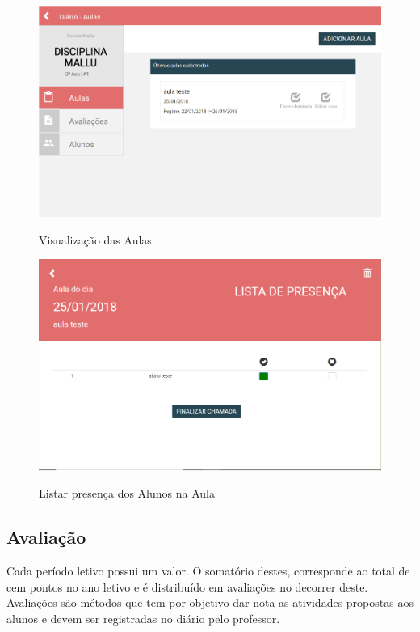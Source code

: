 \begin{figure}[!htb]
	\centering
	\caption{Visualização das Aulas } %
	\includegraphics[scale=0.4]{visualizaAulas}\\  %
	{\small } %
	\label{visualizaAulas} %
\end{figure}

\begin{figure}[!htb]
	\centering
	\caption{Listar presença dos Alunos na Aula } %
	\includegraphics[scale=0.4]{listaPresenca}\\  %
	{\small } %
	\label{listaPresenca} %
\end{figure}

\subsection{Avaliação}

Cada período letivo possui um valor. O somatório destes, corresponde ao total de cem pontos no ano letivo e é distribuído em avaliações no decorrer deste. Avaliações são métodos que tem por objetivo dar nota as atividades propostas aos alunos e devem ser registradas no diário pelo professor.

